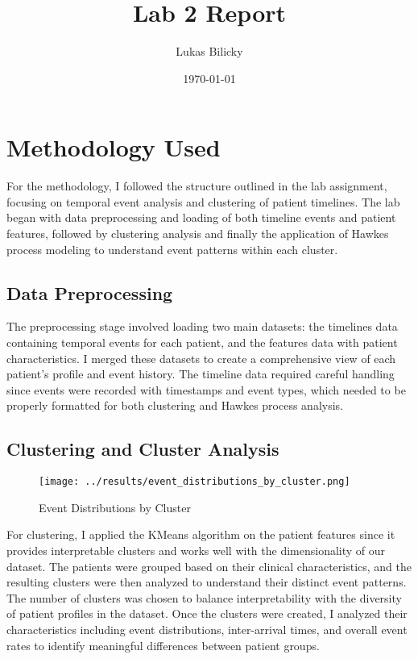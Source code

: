 \documentclass[a4paper,12pt]{article}
\title{Lab 2 Report}
\author{Lukas Bilicky}
\date{\today}
\begin{document}
\maketitle


\section{Methodology Used}
For the methodology, I followed the structure outlined in the lab assignment, focusing on temporal event analysis and clustering of patient timelines. The lab began with data preprocessing and loading of both timeline events and patient features, followed by clustering analysis and finally the application of Hawkes process modeling to understand event patterns within each cluster.

\subsection{Data Preprocessing}

The preprocessing stage involved loading two main datasets: the timelines data containing temporal events for each patient, and the features data with patient characteristics. I merged these datasets to create a comprehensive view of each patient's profile and event history. The timeline data required careful handling since events were recorded with timestamps and event types, which needed to be properly formatted for both clustering and Hawkes process analysis.

\subsection{Clustering and Cluster Analysis}

\begin{wrapfigure}{r}{0.5\linewidth}
  \centering
  \texttt{[image: ../results/event\_distributions\_by\_cluster.png]}
  \caption{Event Distributions by Cluster}
  \label{fig:event_distributions_by_cluster}
\end{wrapfigure}

For clustering, I applied the KMeans algorithm on the patient features since it provides interpretable clusters and works well with the dimensionality of our dataset. The patients were grouped based on their clinical characteristics, and the resulting clusters were then analyzed to understand their distinct event patterns. The number of clusters was chosen to balance interpretability with the diversity of patient profiles in the dataset. Once the clusters were created, I analyzed their characteristics including event distributions, inter-arrival times, and overall event rates to identify meaningful differences between patient groups.
\end{document}
